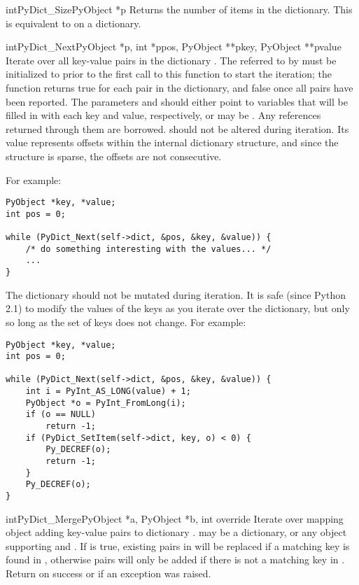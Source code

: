 \begin{cfuncdesc}{int}{PyDict_Size}{PyObject *p}
  Returns the number of items in the dictionary.  This is equivalent
  to  on a dictionary.
\end{cfuncdesc}

\begin{cfuncdesc}{int}{PyDict_Next}{PyObject *p, int *ppos,
                                    PyObject **pkey, PyObject **pvalue}
  Iterate over all key-value pairs in the dictionary .  The
   referred to by  must be initialized to
   prior to the first call to this function to start the
  iteration; the function returns true for each pair in the
  dictionary, and false once all pairs have been reported.  The
  parameters  and  should either point to
   variables that will be filled in with each key and
  value, respectively, or may be \NULL{}.  Any references returned through
  them are borrowed.   should not be altered during iteration.
  Its value represents offsets within the internal dictionary structure,
  and since the structure is sparse, the offsets are not consecutive.

  For example:

\begin{verbatim}
PyObject *key, *value;
int pos = 0;

while (PyDict_Next(self->dict, &pos, &key, &value)) {
    /* do something interesting with the values... */
    ...
}
\end{verbatim}

  The dictionary  should not be mutated during iteration.  It
  is safe (since Python 2.1) to modify the values of the keys as you
  iterate over the dictionary, but only so long as the set of keys
  does not change.  For example:

\begin{verbatim}
PyObject *key, *value;
int pos = 0;

while (PyDict_Next(self->dict, &pos, &key, &value)) {
    int i = PyInt_AS_LONG(value) + 1;
    PyObject *o = PyInt_FromLong(i);
    if (o == NULL)
        return -1;
    if (PyDict_SetItem(self->dict, key, o) < 0) {
        Py_DECREF(o);
        return -1;
    }
    Py_DECREF(o);
}
\end{verbatim}
\end{cfuncdesc}

\begin{cfuncdesc}{int}{PyDict_Merge}{PyObject *a, PyObject *b, int override}
  Iterate over mapping object  adding key-value pairs to dictionary
  .
   may be a dictionary, or any object supporting
   and .
  If  is true, existing pairs in  will
  be replaced if a matching key is found in , otherwise pairs
  will only be added if there is not a matching key in .
  Return  on success or  if an exception was
  raised.
\end{cfuncdesc}

